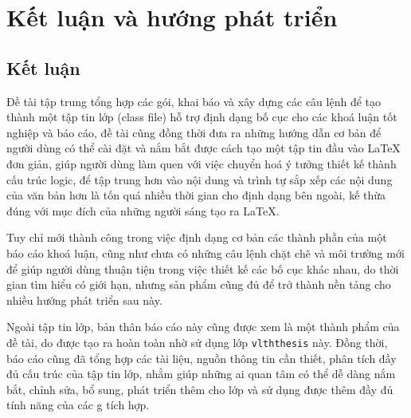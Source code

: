 \chapter{Kết luận và hướng phát triển}\label{ch:4}
\section{Kết luận}\label{sec:4.1}
Đề tài tập trung tổng hợp các gói, khai báo và xây dựng các câu lệnh để tạo thành một tập tin lớp (class file)
hỗ trợ định dạng bố cục cho các khoá luận tốt nghiệp và báo cáo, đề tài cũng đồng thời đưa ra những
hướng dẫn cơ bản để người dùng có thể cài đặt và nắm bắt được cách tạo một tập tin đầu vào LaTeX đơn giản,
giúp người dùng làm quen với việc chuyển hoá ý tưởng thiết kế thành cấu trúc logic, để tập trung hơn
vào nội dung và trình tự sắp xếp các nội dung của văn bản hơn là tốn quá nhiều thời gian cho định
dạng bên ngoài, kế thừa đúng với mục đích của những người sáng tạo ra LaTeX.\par
Tuy chỉ mới thành công trong việc định dạng cơ bản các thành phần của một báo cáo khoá luận, cũng như
chưa có những câu lệnh chặt chẽ và môi trường mới để giúp người dùng thuận tiện trong việc
thiết kế các bố cục khác nhau, do thời gian tìm hiểu có giới hạn, nhưng sản phẩm cũng đủ để trở thành nền tảng cho nhiều hướng
phát triển sau này.\par
Ngoài tập tin lớp, bản thân báo cáo này cũng được xem là một thành phẩm của đề tài, do được tạo ra hoàn toàn
nhờ sử dụng lớp \texttt{vlththesis} này. Đồng thời, báo cáo cũng đã tổng hợp các tài liệu, nguồn thông tin
cần thiết, phân tích đầy đủ cấu trúc của tập tin lớp, nhằm giúp những ai quan tâm có thể dễ dàng nắm bắt,
chỉnh sửa, bổ sung, phát triển thêm cho lớp và sử dụng được thêm đầy đủ tính năng của các
g tích hợp.\par
